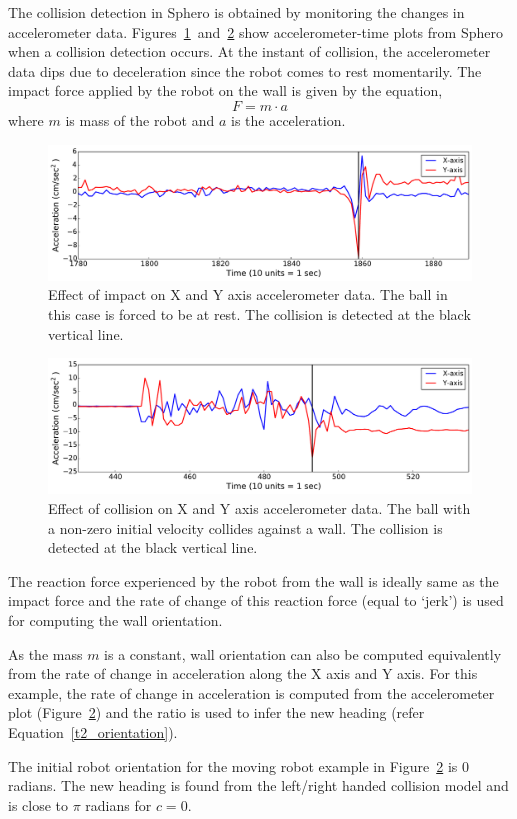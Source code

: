 \begin{exmp}
The collision detection in Sphero is obtained by monitoring the changes in accelerometer data. Figures~\ref{ball_scoll}~and~\ref{ball_scoll2} show accelerometer-time plots from Sphero when a collision detection occurs. At the instant of collision, the accelerometer data dips due to deceleration since the robot comes to rest momentarily. The impact force applied by the robot on the wall is given by the equation,
\begin{equation*}
F = m\cdot a
\end{equation*}
where $m$ is mass of the robot and $a$ is the acceleration. 

\begin{figure}
\centering
\includegraphics[scale=0.4]{./images/acc_data}
\caption{Effect of impact on X and Y axis accelerometer data. The ball in this case is forced to be at rest. The collision is detected at the black vertical line.}
\label{ball_scoll}
\end{figure}
\begin{figure}
\centering
\includegraphics[scale=0.4]{./images/acc_data2}
\caption{Effect of collision on X and Y axis accelerometer data. The ball with a non-zero initial velocity collides against a wall. The collision is detected at the black vertical line.}
\label{ball_scoll2}
\end{figure}

The reaction force experienced by the robot from the wall is ideally same as the impact force and the rate of change of this reaction force (equal to `jerk') is used for computing the wall orientation. 

As the mass $m$ is a constant, wall orientation can also be computed equivalently from the rate of change in acceleration along the X axis and Y axis. For this example, the rate of change in acceleration is computed from the accelerometer plot (Figure~\ref{ball_scoll2}) and the ratio is used to infer the new heading (refer Equation~\ref{t2_orientation}).

The initial robot orientation for the moving robot example in Figure~\ref{ball_scoll2} is 0 radians. The new heading is found from the left/right handed collision model and is close to $\pi$ radians for $c=0$.
\label{ex_head}
\end{exmp}

